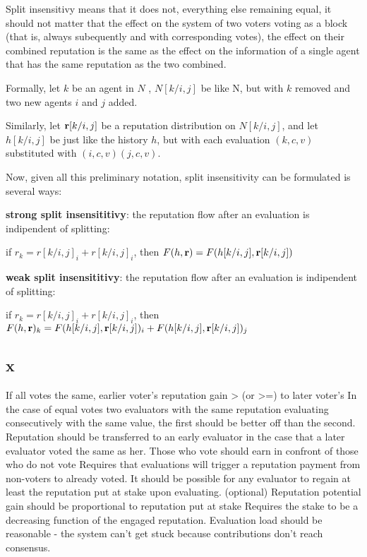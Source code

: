 \documentclass{article}
\begin{document}
Split insensitivy means that it does not, everything else remaining equal, it should not matter that the effect on the system of two voters voting as a block (that is, always subequently and with corresponding votes), the effect on their combined reputation is the same as the effect on the information of a single agent that has the same reputation as the two combined.

Formally, let $k$ be an agent in $N$ , $N[k/{i,j}]$ be like N, but with $k$ removed and two new agents $i$ and $j$ added.

Similarly, let ${\bf r}[k/{i,j}]$ be a reputation distribution on $N[k/{i,j}]$, and let $h[k/{i,j}]$ be just like the history $h$, but with each evaluation $(k, c, v)$ substituted with $(i, c, v) (j, c, v)$.

Now, given all this preliminary notation, split insensitivity can be formulated is several ways:

{\bf strong split insensititivy}: the reputation flow after an evaluation is indipendent of splitting:
\begin{center}
if $r_k = r[k/{i,j}]_i +r[k/{i,j}]_i$, then $F(h, {\bf r}) = F(h[k/{i,j}], {\bf r}[k/{i,j}])$
\end{center}


{\bf weak split insensititivy}: the reputation flow after an evaluation is indipendent of splitting:
\begin{center}
if $r_k = r[k/{i,j}]_i +r[k/{i,j}]_i$, then $F(h, {\bf r})_k = F(h[k/{i,j}], {\bf r}[k/{i,j}])_i + F(h[k/{i,j}], {\bf r}[k/{i,j}])_j$
\end{center}

\subsection{x}
If all votes the same, earlier voter’s reputation gain > (or >=) to later voter’s
In the case of equal votes two evaluators with the same reputation evaluating consecutively with the same value, the first should be better off than the second.
Reputation should be transferred to an early evaluator in the case that a later evaluator voted the same as her.
Those who vote should earn in confront of those who do not vote
Requires that evaluations will trigger a reputation payment from non-voters to already voted.
It should be possible for any evaluator to regain at least the reputation put at stake upon evaluating.
(optional) Reputation potential gain should be proportional to reputation put at stake
Requires the stake to be a decreasing function of the engaged reputation.
Evaluation load should be reasonable - the system can’t get stuck because contributions don’t reach consensus.
\end{document}
